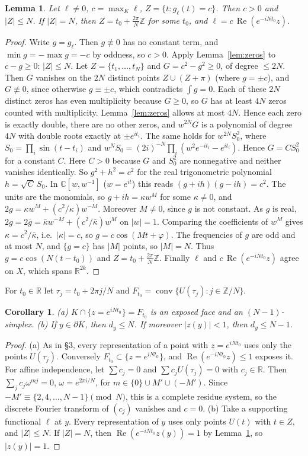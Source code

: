 \documentclass[11pt]{amsart}
\newtheorem{lemma}[theorem]{Lemma}
\newtheorem{corollary}[theorem]{Corollary}
\theoremstyle{remark}
\newcommand{\R}{\mathbb{R}}
\newcommand{\C}{\mathbb{C}}
\newcommand{\Z}{\mathbb{Z}}
\newcommand{\conv}{\operatorname{conv}}
\newcommand{\re}{\operatorname{Re}}
\begin{document}
\begin{lemma}\label{lem:support}
Let $\ell\ne0$, $c=\max_K\ell$, $Z=\{t: g_\ell(t)=c\}$. Then $c>0$ and $|Z|\le N$. If $|Z|=N$, then $Z=t_0+\frac{2\pi}N\Z$ for some $t_0$, and
$\ell=c\,\re(e^{-iNt_0}z)$.
\end{lemma}
\begin{proof}
Write $g=g_\ell$. Then $g\not\equiv0$ has no constant term, and $\min g=-\max g=-c$ by oddness, so $c>0$. Apply Lemma~\ref{lem:zeros} to $c-g\ge0$: $|Z|\le N$.
Let $Z=\{t_1,\dots,t_N\}$ and $G=c^2-g^2\ge0$, of degree $\le2N$. Then $G$ vanishes on the $2N$ distinct points $Z\cup(Z+\pi)$ (where $g=\pm c$), and
$G\not\equiv0$, since otherwise $g\equiv\pm c$, which contradicts $\int g=0$. Each of these $2N$ distinct zeros has even multiplicity because $G\ge0$, so $G$ has
at least $4N$ zeros counted with multiplicity. Lemma~\ref{lem:zeros} allows at most $4N$. Hence each zero is exactly double, there are no other zeros, and
$w^{2N}G$ is a polynomial of degree $4N$ with double roots exactly at $\pm e^{it_i}$. The same holds for $w^{2N}S_0^2$, where $S_0=\prod_i\sin(t-t_i)$ and
$w^NS_0=(2i)^{-N}\prod_i(w^2e^{-it_i}-e^{it_i})$. Hence $G=CS_0^2$ for a constant $C$. Here $C>0$ because $G$ and $S_0^2$ are nonnegative and neither vanishes identically.
So $g^2+h^2=c^2$ for the real trigonometric polynomial $h=\sqrt C\,S_0$. In $\C[w,w^{-1}]$ ($w=e^{it}$) this reads $(g+ih)(g-ih)=c^2$. The units are the monomials, so
$g+ih=\kappa w^M$ for some $\kappa\ne0$, and $2g=\kappa w^M+(c^2/\kappa)w^{-M}$. Moreover $M\ne0$, since $g$ is not constant. As $g$ is real, $2g=2\bar g=\bar\kappa w^{-M}+(c^2/\bar\kappa)w^M$ on $|w|=1$.
Comparing the coefficients of $w^M$ gives $\kappa=c^2/\bar\kappa$, i.e.\ $|\kappa|=c$, so $g=c\cos(Mt+\varphi)$.
The frequencies of $g$ are odd and at most $N$, and $\{g=c\}$ has $|M|$ points, so $|M|=N$. Thus $g=c\cos(N(t-t_0))$ and $Z=t_0+\frac{2\pi}N\Z$. Finally $\ell$ and $c\,\re(e^{-iNt_0}z)$
agree on $X$, which spans $\R^{2k}$.
\end{proof}

For $t_0\in\R$ let $\tau_j=t_0+2\pi j/N$ and $F_{t_0}=\conv\{U(\tau_j):j\in\Z/N\}$.

\begin{corollary}\label{cor:facesA}
(a) $K\cap\{z=e^{iNt_0}\}=F_{t_0}$ is an exposed face and an $(N-1)$-simplex. (b) If $y\in\partial K$, then $d_y\le N$. If moreover $|z(y)|<1$, then $d_y\le N-1$.
\end{corollary}
\begin{proof}
(a) As in \S3, every representation of a point with $z=e^{iNt_0}$ uses only the points $U(\tau_j)$. Conversely $F_{t_0}\subset\{z=e^{iNt_0}\}$, and
$\re(e^{-iNt_0}z)\le1$ exposes it. For affine independence, let $\sum c_j=0$ and $\sum c_jU(\tau_j)=0$ with $c_j\in\R$. Then $\sum_jc_j\omega^{mj}=0$, $\omega=e^{2\pi i/N}$, for
$m\in\{0\}\cup M'\cup(-M')$. Since $-M'\equiv\{2,4,\dots,N-1\}\pmod N$, this is a complete residue system, so the discrete Fourier transform of $(c_j)$ vanishes and $c=0$.
(b) Take a supporting functional $\ell$ at $y$. Every representation of $y$ uses only points $U(t)$ with $t\in Z$, and $|Z|\le N$. If $|Z|=N$, then $\re(e^{-iNt_0}z(y))=1$
by Lemma~\ref{lem:support}, so $|z(y)|=1$.
\end{proof}
\end{document}
